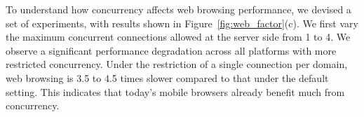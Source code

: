 


To understand how concurrency affects web browsing performance, we
devised a set of experiments, with results shown in 
Figure~\ref{fig:web_factor}(c). %
We first vary the maximum concurrent connections allowed at the server 
side from 1 to 4. We observe a significant performance degradation 
across all platforms with more restricted concurrency. Under the 
restriction of a single connection per domain, web browsing is 3.5 
to 4.5 times slower compared to that under the default setting. This 
indicates that today's mobile browsers already benefit much from 
concurrency.

